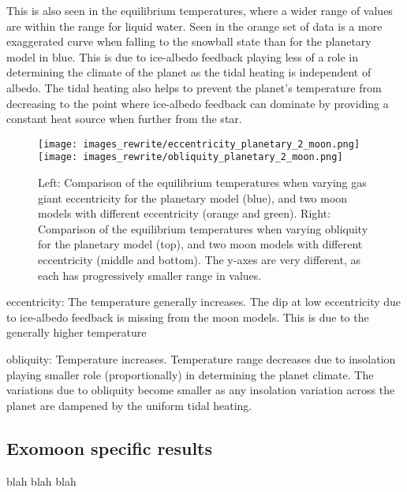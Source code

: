 \documentclass[12pt, onecolumn]{revtex4-2}    %
\begin{document}
This is also seen in the equilibrium temperatures, where a wider range of values are within the range for liquid water. 
Seen in the orange set of data is a more exaggerated curve when falling to the snowball state than for the planetary model in blue.
This is due to ice-albedo feedback playing less of a role in determining the climate of the planet as the tidal heating is independent of albedo.
The tidal heating also helps to prevent the planet's temperature from decreasing to the point where ice-albedo feedback can dominate by providing a constant heat source when further from the star.

\begin{figure}[t]
  \texttt{[image: images\_rewrite/eccentricity\_planetary\_2\_moon.png]}
  \texttt{[image: images\_rewrite/obliquity\_planetary\_2\_moon.png]}
  \caption{
    Left: Comparison of the equilibrium temperatures when varying gas giant eccentricity for the planetary model (blue), and two moon models with different eccentricity (orange and green).
    Right: Comparison of the equilibrium temperatures when varying obliquity for the planetary model (top), and two moon models with different eccentricity (middle and bottom).
    The y-axes are very different, as each has progressively smaller range in values.
  }
  \label{fig:eccentricity_obliquity_comparisions}
\end{figure}

eccentricity:
The temperature generally increases.
The dip at low eccentricity due to ice-albedo feedback is missing from the moon models.
This is due to the generally higher temperature 

obliquity:
Temperature increases.
Temperature range decreases due to insolation playing smaller role (proportionally) in determining the planet climate.
The variations due to obliquity become smaller as any insolation variation across the planet are dampened by the uniform tidal heating.

\subsection{Exomoon specific results} \label{ssec:Exomoon_specific_results}
%
blah blah blah 
\end{document}
